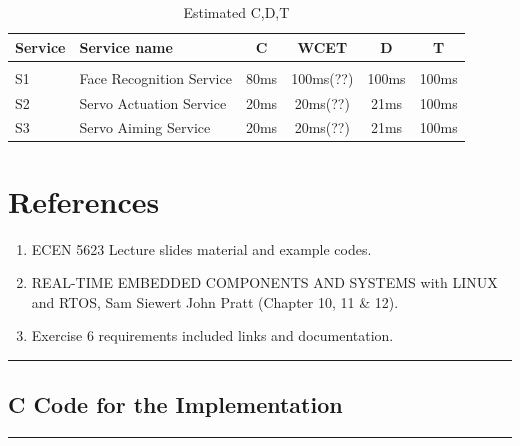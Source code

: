 \documentclass[a4paper,11pt]{article}%
\newenvironment{qanda}{\setlength{\parindent}{0pt}}{\bigskip}
\begin{document}
\begin{qanda}
\begin{enumerate}
			\begin{table}[H]
				\centering
				\begin{tabular}{l l c c c c}
					\hline
					\textbf{Service} & \textbf{Service name}    & \textbf{C} & \textbf{WCET} & \textbf{D} & \textbf{T} \\\hline
					                 &                          &                                                      \\
					S1               & Face Recognition Service & 80ms       & 100ms(??)     & 100ms      & 100ms      \\
					S2               & Servo Actuation Service  & 20ms       & 20ms(??)      & 21ms       & 100ms      \\
					S3               & Servo Aiming Service     & 20ms       & 20ms(??)      & 21ms       & 100ms      \\

					\hline\hline
				\end{tabular}
				\caption{Estimated C,D,T}
			\end{table}

	\end{enumerate}

	\pagebreak

	\section{References}
	\begin{enumerate}
		\item ECEN 5623 Lecture slides material and example codes.
		\item REAL-TIME EMBEDDED COMPONENTS AND SYSTEMS with LINUX and RTOS, Sam Siewert John
		      Pratt (Chapter 10, 11 \& 12).
		\item Exercise 6 requirements included links and documentation.
	\end{enumerate}

	
	


\end{qanda}




\vfill
\hrule
\vspace{0.5cm}
\pagebreak
\begin{appendices}
	\section{C Code for the Implementation}
	
	\pagebreak
\end{appendices}


\vspace{1cm}
\hrule
\vspace{0.5cm}


\end{document}
